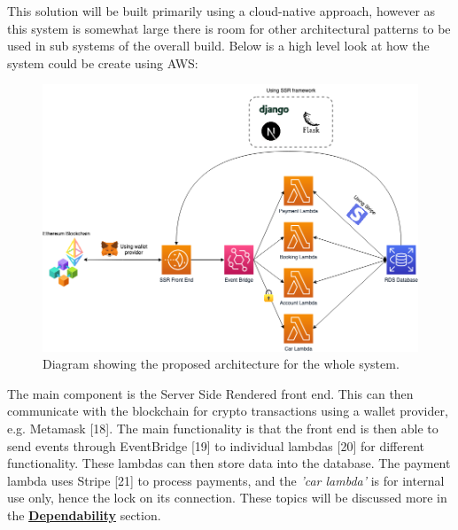   This solution will be built primarily using a cloud-native approach, however as this system is somewhat large there is room for other 
  architectural patterns to be used in sub systems of the overall build. Below is a high level look at how the system could be create using AWS:

  \begin{figure}[H]
    \centering
    \includegraphics[width=12cm]{assets/architectureEvents.drawio.png}
    \caption{Diagram showing the proposed architecture for the whole system.}
    \label{fig:architecture}
  \end{figure}

  The main component is the Server Side Rendered front end. This can then communicate with the blockchain for crypto transactions using a wallet provider,
  e.g. Metamask [18]. The main functionality is that the front end is then able to send events through EventBridge [19] to individual lambdas [20] for different 
  functionality. These lambdas can then store data into the database. The payment lambda uses Stripe [21] to process payments, and the \textit{'car lambda'} is
  for internal use only, hence the lock on its connection. These topics will be discussed more in the 
  \hyperref[sec:Dependability]{\textbf{Dependability}} section.